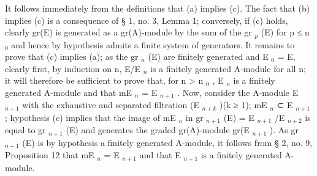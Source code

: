 It follows immediately from the definitions that (a) implies (c). The fact that (b) implies (c) is a consequence of § 1, no. 3, Lemma 1; conversely, if (c) holds, clearly gr(E) is generated as a gr(A)-module by the sum of the gr \(_{p}\) (E) for p ≤ n \(_{0}\) and hence by hypothesis admits a finite system of generators. It remains to prove that (c) implies (a); as the gr \(_{n}\) (E) are finitely generated and E \(_{0}\) = E, clearly first, by induction on n, E/E \(_{n}\) is a finitely generated A-module for all n; it will therefore be sufficient to prove that, for n \textgreater{} n \(_{0}\) , E \(_{n}\) is a finitely generated A-module and that mE \(_{n}\) = E \(_{n+1}\) . Now, consider the A-module E \(_{n+1}\) with the exhaustive and separated filtration (E \(_{n+k}\) )(k ≥ 1); mE \(_{n}\) ⊂ E \(_{n+1}\) ; hypothesis (c) implies that the image of mE \(_{n}\) in gr \(_{n+1}\) (E) = E \(_{n+1}\) /E \(_{n+2}\) is equal to gr \(_{n+1}\) (E) and generates the graded gr(A)-module gr(E \(_{n+1}\) ). As gr \(_{n+1}\) (E) is by hypothesis a finitely generated A-module, it follows from § 2, no. 9, Proposition 12 that mE \(_{n}\) = E \(_{n+1}\) and that E \(_{n+1}\) is a finitely generated A-module.

